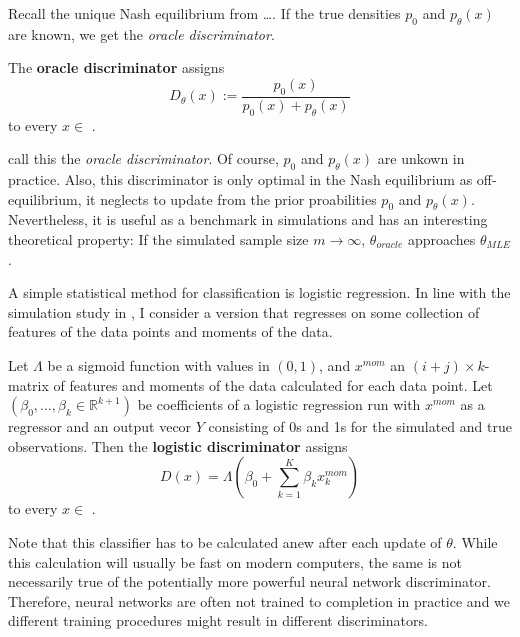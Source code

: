 Recall the unique Nash equilibrium from \dots.
If the true densities $p_0$ and $p_\theta(x)$ are known, we get the \textit{oracle discriminator}. %

\begin{definition}
    The \textbf{oracle discriminator} assigns
    \begin{equation}
        D_\theta(x):=\frac{p_0(x)}{p_0(x)+p_\theta(x)} %
    \end{equation}
    to every $x \in$ . %
\end{definition}

\textcite{kaji2023adversarial} call this the \textit{oracle discriminator}.
Of course, $p_0$ and $p_\theta(x)$ are unkown in practice.
Also, this discriminator is only optimal in the Nash equilibrium %
as off-equilibrium, it neglects to update from the prior proabilities $p_0$ and $p_\theta(x)$.  %
Nevertheless, it is useful as a benchmark in simulations and has an interesting theoretical property:
If the simulated sample size $m \rightarrow \infty$, $\theta_{oracle}$ approaches $\theta_{MLE}$. %

A simple statistical method for classification is logistic regression.
In line with the simulation study in \textcite{kaji2023adversarial}, I consider a version that regresses on some collection of features of the data points and moments of the data.

\begin{definition}
    Let $\Lambda$ be a sigmoid function with values in $(0,1)$, and $x^{mom}$ an $(i+j)\times k$-matrix of features and moments of the data calculated for each data point.
    Let $(\beta_0, \dots,\beta_k \in \mathbb{R}^{k+1})$ be coefficients of a logistic regression run with $x^{mom}$ as a regressor and an output vecor $Y$ consisting of 0s and 1s for the simulated and true observations. %
    Then the \textbf{logistic discriminator} assigns
    \begin{equation}
        D(x) = \Lambda(\beta_{0} + \sum_{k=1}^{K}\beta_{k} x_{k}^{mom}) %
    \end{equation}
    to every $x \in$ . %
\end{definition}

Note that this classifier has to be calculated anew after each update of $\theta$.
While this calculation will usually be fast on modern computers, the same is not necessarily true of the potentially more powerful neural network discriminator.
Therefore, neural networks are often not trained to completion in practice and we different training procedures might result in different discriminators.

